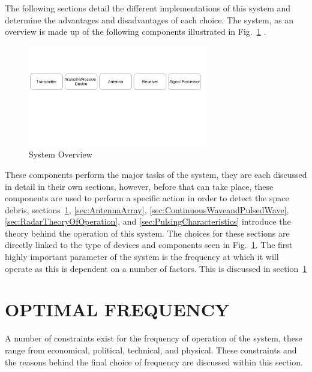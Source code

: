 \documentclass[11pt]{witseiepaper}
\begin{document}
\begin{bibunit}[witseie]
The following sections detail the different implementations of this system and determine the advantages and disadvantages of each choice.
The system, as an overview is made up of the following components illustrated in Fig.~\ref{fig:SystemOverview} \cite{radarHandbook}.

\begin{center}
    \begin{figure}
        \centering
        \includegraphics[width=0.7\textwidth]{SystemOverview.pdf}
        \caption{System Overview}
        \label{fig:SystemOverview}    
    \end{figure}
\end{center}

These components perform the major tasks of the system, they are each discussed in detail in their own sections, however, before that can take place, these components are used to perform a specific action in order to detect the space debris, sections~\ref{sec:OptimalFrequency}, \ref{sec:AntennaArray}, \ref{sec:ContinuousWaveandPulsedWave}, \ref{sec:RadarTheoryOfOperation}, and \ref{sec:PulsingCharacteristics} introduce the theory behind the operation of this system. The choices for these sections are directly linked to the type of devices and components seen in Fig.~\ref{fig:SystemOverview}.
The first highly important parameter of the system is the frequency at which it will operate as this is dependent on a number of factors. This is discussed in section~\ref{sec:OptimalFrequency}


\section{OPTIMAL FREQUENCY} \label{sec:OptimalFrequency}
A number of constraints exist for the frequency of operation of the system, these range from economical, political, technical, and physical. These constraints and the reasons behind the final choice of frequency are discussed within this section.


\end{bibunit}
\end{document}
